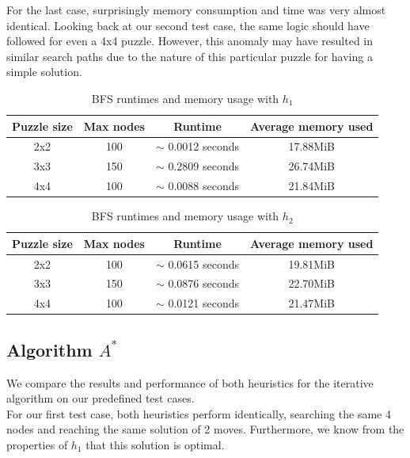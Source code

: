 \documentclass[runningheads]{llncs}
\begin{document}
For the last case, surprisingly memory consumption and time was very almost identical. Looking back at our second test case, the same logic should have followed for even a 4x4 puzzle. However, this anomaly may have resulted in similar search paths due to the nature of this particular puzzle for having a simple solution.

\begin{table}
    \centering
    \caption{BFS runtimes and memory usage with $h_1$}\label{tab1}
    \begin{tabular}{|c|c|c|c|}
        \hline
        \textbf{Puzzle size} & \textbf{Max nodes} & \textbf{Runtime} & \textbf{Average memory used} \\
        \hline
        2x2 & 100 & $\sim$ 0.0012 seconds & 17.88MiB \\ \hline
        3x3 & 150 & $\sim$ 0.2809 seconds & 26.74MiB \\ \hline
        4x4 & 100 & $\sim$ 0.0088 seconds & 21.84MiB \\ \hline
    \end{tabular}
\end{table}

\begin{table}
    \centering
    \caption{BFS runtimes and memory usage with $h_2$}\label{tab2}
    \begin{tabular}{|c|c|c|c|}
        \hline
        \textbf{Puzzle size} & \textbf{Max nodes} & \textbf{Runtime} & \textbf{Average memory used} \\
        \hline
        2x2 & 100 & $\sim$ 0.0615 seconds & 19.81MiB \\ \hline
        3x3 & 150 & $\sim$ 0.0876 seconds & 22.70MiB \\ \hline
        4x4 & 100 & $\sim$ 0.0121 seconds & 21.47MiB \\ \hline
    \end{tabular}
\end{table}

\subsection{Algorithm $A^{*}$}

We compare the results and performance of both heuristics for the iterative algorithm on our predefined test cases. \\

For our first test case, both heuristics perform identically, searching the same 4 nodes and reaching the same solution of 2 moves. Furthermore, we know from the properties of $h_1$ that this solution is optimal. \\
\end{document}
